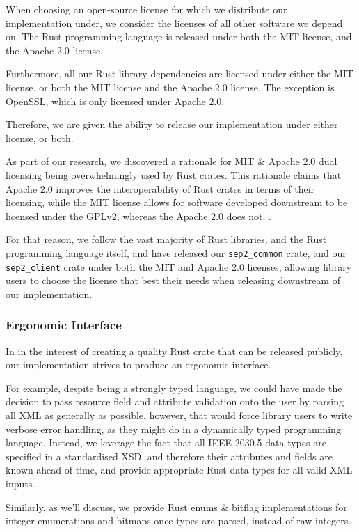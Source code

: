 When choosing an open-source license for which we distribute our implementation under, we consider the licenses of all other software we depend on. The Rust programming language is released under both the MIT license, and the Apache 2.0 license. 

Furthermore, all our Rust library dependencies are licensed under either the MIT license, or both the MIT license and the Apache 2.0 license. The exception is OpenSSL, which is only licensed under Apache 2.0.

Therefore, we are given the ability to release our implementation under either license, or both. 

As part of our research, we discovered a rationale for MIT \& Apache 2.0 dual licensing being overwhelmingly used by Rust crates. This rationale claims that Apache 2.0 improves the interoperability of Rust crates in terms of their licensing, while the MIT license allows for software developed downstream to be licensed under the GPLv2, whereas the Apache 2.0 does not. \cite{relicense} \cite{relicensejosh}. 


For that reason, we follow the vast majority of Rust libraries, and the Rust programming language itself, and have released our \texttt{sep2\_common} crate, and our \texttt{sep2\_client} crate under both the MIT and Apache 2.0 licenses, allowing library users to choose the license that best their needs when releasing downstream of our implementation.

\subsubsection{Ergonomic Interface}

In in the interest of creating a quality Rust crate that can be released publicly, our implementation strives to produce an ergonomic interface. 

For example, despite being a strongly typed language, we could have made the decision to pass resource field and attribute validation onto the user by parsing all XML as generally as possible, however, that would force library users to write verbose error handling, as they might do in a dynamically typed programming language. Instead, we leverage the fact that all IEEE 2030.5 data types are specified in a standardised XSD, and therefore their attributes and fields are known ahead of time, and provide appropriate Rust data types for all valid XML inputs.

Similarly, as we'll discuss, we provide Rust enums \& bitflag implementations for integer enumerations and bitmaps once types are parsed, instead of raw integers.

